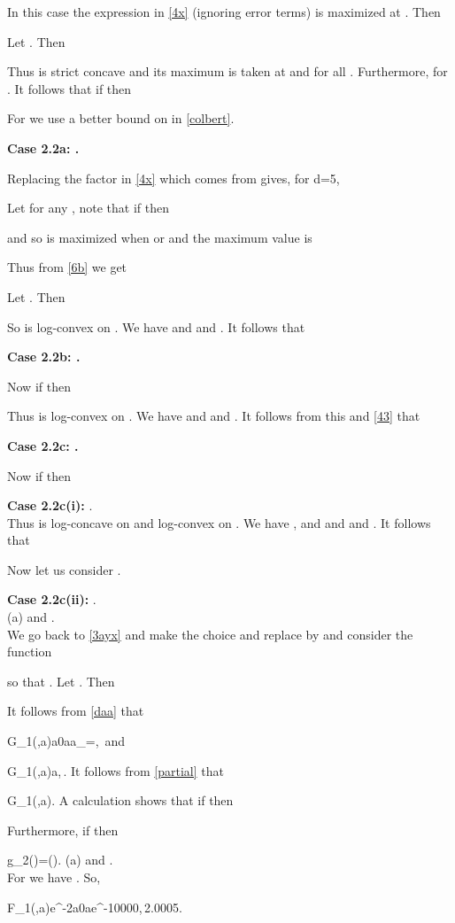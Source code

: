 \documentclass[11pt]{article}
\def\th{\theta}
\newcommand{\brac}[1]{\left(#1\right)}
\newcommand{\bfrac}[2]{\brac{\frac{#1}{#2}}}
\newcommand{\beq}[1]{}
\begin{document}
In this case the expression in \eqref{4x} (ignoring error terms) is maximized at . Then

Let . Then


Thus  is strict concave and its maximum is taken at  and  for all .
Furthermore,  for . It follows that if  then

For  we use a better bound on  in \eqref{colbert}. 

{\bf Case 2.2a: .}


Replacing the  factor in \eqref{4x} which comes from  gives, for d=5,


Let  for any , note that if  then

and so  is maximized when  or  and the maximum value is 

Thus from \eqref{6b} we get 

Let . Then


So  is log-convex on . We have  and 
and . It follows that

{\bf Case 2.2b: .}



Now if  then

Thus  is log-convex on . We have  and 
and . It follows from this and \eqref{43} that

{\bf Case 2.2c: .}



Now if  then

{\bf Case 2.2c(i):} .\\
Thus  is log-concave on  and log-convex on . 
We have , 
and  and  and . It follows that

Now let us consider . 

{\bf Case 2.2c(ii):} .\\
(a)  and .\\
We go back to \eqref{3ayx} and make the choice  and replace
 by  and 
consider the function 

so that . Let . Then

It follows from \eqref{daa} that 
\beq{isconvex}
G_1(\th,a)a0\leq a\leq a_\th=\frac{3\th-6}{\th},\,
\eeq
and 
\beq{isconcave}
G_1(\th,a)a,\,. 
\eeq
It follows from \eqref{partial} that
\beq{isisconcave}
G_1(\th,a). 
\eeq
A calculation shows that if  then

Furthermore, if  then
\beq{short}
g_2(\th)=\log\bfrac{12}{3^\th(3-\th)}.
\eeq
(a)  and .\\
For  we have . So,
\beq{smalla}
F_1(\th,a)\leq e^{-2a}0\leq a\leq e^{-10000},\,2.0005\leq \th{}.
\eeq
\end{document}
